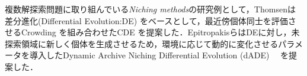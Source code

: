 \documentclass[a4j,11pt]{jarticle}
\def\proposed{DNRBA}
\begin{document}
複数解探索問題に取り組んでいる{\it Niching methods}の研究例として，Thomsenは差分進化(Differential Evolution:DE) \cite{DE} をベースとして，最近傍個体同士を評価させるCrowding \cite{Crowding} を組み合わせたCDE \cite{CDE} を提案した．EpitropakisらはDEに対し，未探索領域に新しく個体を生成させるため，環境に応じて動的に変化させるパラメータを導入したDynamic Archive Niching Differential Evolution (dADE)　\cite{dADE} を提案した．





\newpage
\end{document}
